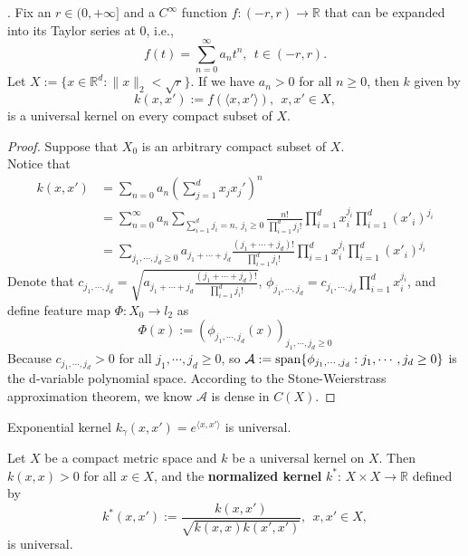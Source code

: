 \begin{corollary}.
	Fix an $r\in (0,+\infty]$ and a $C^\infty$ function $f:(-r,r) \rightarrow \mathbb{R}$ that can be expanded into its Taylor series at 0, i.e., 
	\begin{equation}
	f(t) = \sum_{n = 0}^\infty a_n t^n, ~~t\in (-r,r).
	\end{equation}
	Let $X:= \{x\in \mathbb{R}^d: \|x\|_2 < \sqrt{r}\}$. If we have $a_n>0$ for all $n\geq 0$, then $k$ given by
	\begin{equation}
	k(x,x') := f(\langle x,x'\rangle),~~x,x'\in X,
	\end{equation}
	is a universal kernel on every compact subset of $X$.
\end{corollary}

\begin{proof}
	Suppose that $X_0$ is an arbitrary compact subset of $X$.\\
	Notice that
	\begin{align*}
	k(x,x') &= \sum_{n = 0} a_n (\sum_{j = 1}^d x_j x_j')^n\\
	&= \sum_{n =0}^\infty a_n \sum_{\sum_{i = 1}^d j_i= n,~j_i\geq0} \frac{n!}{\prod_{i = 1}^d j_i!} \prod_{i = 1}^d x_i^{j_i}\prod_{i = 1}^d (x'_i)^{j_i}\\
	&= \sum_{j_1,\cdots,j_d\geq0} a_{j_1+\cdots+j_d} \frac{(j_1+\cdots+j_d)!}{\prod_{i = 1}^d j_i!} \prod_{i = 1}^d x_i^{j_i}\prod_{i = 1}^d (x'_i)^{j_i}
	\end{align*}
	Denote that $c_{j_1,\cdots,j_d} = \sqrt{a_{j_1+\cdots+j_d} \frac{(j_1+\cdots+j_d)!}{\prod_{i = 1}^d j_i!}}$, $\phi_{j_1,\cdots,j_d} = c_{j_1,\cdots,j_d} \prod_{i = 1}^d x_i^{j_i}$, and define feature map $\Phi: X_0 \rightarrow l_2$ as
	\begin{equation}
	\Phi(x) := (\phi_{j_1,\cdots,j_d}(x))_{j_1,\cdots,j_d\geq 0}
	\end{equation}
	Because $c_{j_1,\cdots,j_d} > 0$ for all $j_1,\cdots,j_d\geq0$, so $\mathcal{A}:= {\rm span} \{\phi_{j_1,\cdots,j_d}: j_1,\cdots,j_d\geq0\}$ is the d-variable polynomial space. According to the Stone-Weierstrass approximation theorem, we know $\mathcal{A}$ is dense in $C(X)$.
\end{proof}


\begin{corollary}
	Exponential kernel $k_{\gamma}(x,x') = e^{\langle x,x' \rangle}$ is universal.
\end{corollary}

\begin{lemma}
	Let $X$ be a compact metric space and $k$ be a universal kernel on $X$. Then $k(x,x)>0$ for all $x\in X$, and the \textbf{normalized kernel} $k^*$: $X\times X \rightarrow \mathbb{R}$ defined by 
	\begin{equation}
	k^*(x,x') := \frac{k(x,x')}{\sqrt{k(x,x)k(x',x')}},~~x,x'\in X,
	\end{equation}
	is universal.
\end{lemma}


